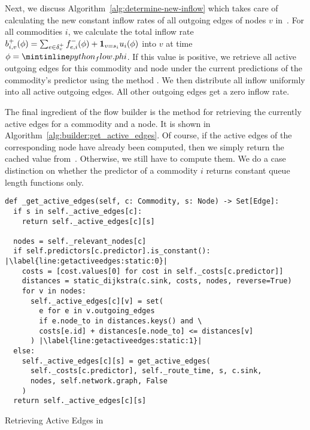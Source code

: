 Next, we discuss Algorithm~\ref{alg:determine-new-inflow} which takes care of calculating the new constant inflow rates of all outgoing edges of nodes $v$ in~.
For all commodities $i$, we calculate the total inflow rate $b_{i,v}^+(\phi) = \sum_{e\in\delta^+_{v}} {f}^-_{e,i}(\phi) + \mathbf{1}_{v=s_i} u_i(\phi)$ into $v$ at time $\phi = \code{_flow.phi}$.
If this value is positive, we retrieve all active outgoing edges for this commodity and node under the current predictions of the commodity's predictor using the method .
We then distribute all inflow uniformly into all active outgoing edges. All other outgoing edges get a zero inflow rate.

The final ingredient of the flow builder is the method  for retrieving the currently active edges for a commodity and a node.
It is shown in Algorithm~\ref{alg:builder:get_active_edges}.
Of course, if the active edges of the corresponding node have already been computed, then we simply return the cached value from~.
Otherwise, we still have to compute them.
We do a case distinction on whether the predictor of a commodity $i$ returns constant queue length functions only.

\newcommand{\dist}{\textrm{dist}}

\begin{algorithm}
  \begin{verbatim}
def _get_active_edges(self, c: Commodity, s: Node) -> Set[Edge]:
  if s in self._active_edges[c]:
    return self._active_edges[c][s]

  nodes = self._relevant_nodes[c]
  if self.predictors[c.predictor].is_constant(): |\label{line:getactiveedges:static:0}|
    costs = [cost.values[0] for cost in self._costs[c.predictor]]
    distances = static_dijkstra(c.sink, costs, nodes, reverse=True)
    for v in nodes:
      self._active_edges[c][v] = set(
        e for e in v.outgoing_edges
        if e.node_to in distances.keys() and \
        costs[e.id] + distances[e.node_to] <= distances[v]
      ) |\label{line:getactiveedges:static:1}|
  else:
    self._active_edges[c][s] = get_active_edges(
      self._costs[c.predictor], self._route_time, s, c.sink,
      nodes, self.network.graph, False
    )
  return self._active_edges[c][s]
\end{verbatim}
\caption{Retrieving Active Edges in }
\label{alg:builder:get_active_edges}
\end{algorithm}

